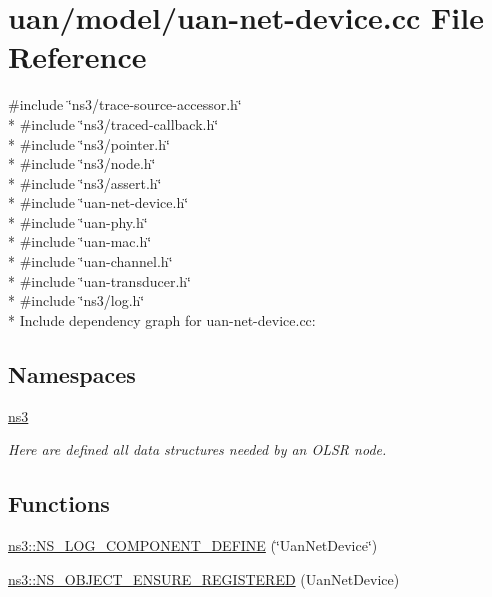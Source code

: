 \hypertarget{uan-net-device_8cc}{}\section{uan/model/uan-\/net-\/device.cc File Reference}
\label{uan-net-device_8cc}
{\ttfamily \#include \char`\"{}ns3/trace-\/source-\/accessor.\+h\char`\"{}}\\*
{\ttfamily \#include \char`\"{}ns3/traced-\/callback.\+h\char`\"{}}\\*
{\ttfamily \#include \char`\"{}ns3/pointer.\+h\char`\"{}}\\*
{\ttfamily \#include \char`\"{}ns3/node.\+h\char`\"{}}\\*
{\ttfamily \#include \char`\"{}ns3/assert.\+h\char`\"{}}\\*
{\ttfamily \#include \char`\"{}uan-\/net-\/device.\+h\char`\"{}}\\*
{\ttfamily \#include \char`\"{}uan-\/phy.\+h\char`\"{}}\\*
{\ttfamily \#include \char`\"{}uan-\/mac.\+h\char`\"{}}\\*
{\ttfamily \#include \char`\"{}uan-\/channel.\+h\char`\"{}}\\*
{\ttfamily \#include \char`\"{}uan-\/transducer.\+h\char`\"{}}\\*
{\ttfamily \#include \char`\"{}ns3/log.\+h\char`\"{}}\\*
Include dependency graph for uan-\/net-\/device.cc\+:
\subsection*{Namespaces}
\begin{DoxyCompactItemize}
\item 
 \hyperlink{namespacens3}{ns3}
\begin{DoxyCompactList}\small\item\em Here are defined all data structures needed by an O\+L\+SR node. \end{DoxyCompactList}\end{DoxyCompactItemize}
\subsection*{Functions}
\begin{DoxyCompactItemize}
\item 
\hyperlink{namespacens3_aced126c1e585faa14bbab633b8a75c0b}{ns3\+::\+N\+S\+\_\+\+L\+O\+G\+\_\+\+C\+O\+M\+P\+O\+N\+E\+N\+T\+\_\+\+D\+E\+F\+I\+NE} (\char`\"{}Uan\+Net\+Device\char`\"{})
\item 
\hyperlink{namespacens3_a40db327e6c04571b487882b223642d35}{ns3\+::\+N\+S\+\_\+\+O\+B\+J\+E\+C\+T\+\_\+\+E\+N\+S\+U\+R\+E\+\_\+\+R\+E\+G\+I\+S\+T\+E\+R\+ED} (Uan\+Net\+Device)
\end{DoxyCompactItemize}
